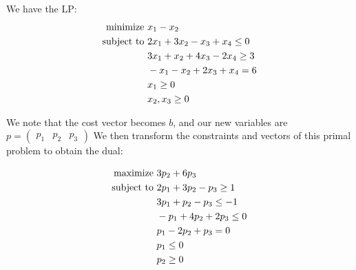 We have the LP:
\begin{align}
    \text{minimize } &x_1 - x_2 \notag\\
    \text{subject to } &2x_1 + 3x_2 - x_3 + x_4 \leq 0 \notag\\
                    &3x_1 + x_2 + 4x_3 - 2x_4 \geq 3 \notag\\
                    &-x_1 - x_2 + 2x_3 + x_4 = 6\notag\\
                    & x_1 \geq 0\notag\\
                    & x_2, x_3 \geq 0\notag
\end{align}

We note that the cost vector becomes $b$, and our new variables are $p=\begin{pmatrix}p_1 & p_2 & p_3\end{pmatrix}$ We then transform the constraints and vectors of this primal problem to obtain the dual:

\begin{align}
    \text{maximize } &3p_2 + 6p_3 \notag\\
    \text{subject to } & 2p_1 + 3p_2 - p_3 \geq 1 \notag\\
                    & 3p_1 + p_2 - p_3 \leq -1 \notag\\
                    & -p_1 + 4p_2 + 2p_3 \leq 0\notag\\
                    & p_1 - 2p_2 + p_3 = 0\notag\\
                    & p_1 \leq 0\notag\\
                    & p_2 \geq 0\notag
\end{align}